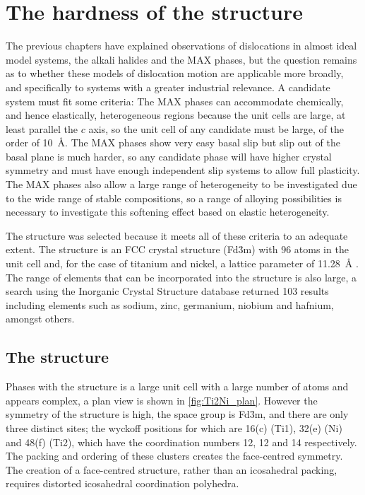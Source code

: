 

\chapter{\texorpdfstring{The hardness of the  structure}{The hardness of the Ti2Ni structure}}
\graphicspath{{hardness_of_ti_2_ni/Figs/}}
\label{chap:ti2ni_hardness}



The previous chapters have explained observations of dislocations in almost ideal model systems, the alkali halides and the MAX phases, but the question remains as to whether these models of dislocation motion are applicable more broadly, and specifically to systems with a greater industrial relevance. A candidate system must fit some criteria: The MAX phases can accommodate chemically, and hence elastically, heterogeneous regions because the unit cells are large, at least parallel the $c$ axis, so the unit cell of any candidate must be large, of the order of \SI{10}{\angstrom}. The MAX phases show very easy basal slip but slip out of the basal plane is much harder, so any candidate phase will have higher crystal symmetry and must have enough independent slip systems to allow full plasticity. The MAX phases also allow a large range of heterogeneity to be investigated due to the wide range of stable compositions, so a range of alloying possibilities is necessary to investigate this softening effect based on elastic heterogeneity.

The  structure was selected because it meets all of these criteria to an adequate extent. The structure is an FCC crystal structure (Fd\={3}m) with 96 atoms in the unit cell and, for the case of titanium and nickel, a lattice parameter of \SI{11.28}{\angstrom} \cite{Yurko1959,Yurko1962}. The range of elements that can be incorporated into the structure is also large, a search using the Inorganic Crystal Structure database \cite{ICSD} returned 103 results including elements such as sodium, zinc, germanium, niobium and hafnium, amongst others.

\section{The \texorpdfstring{}{Ti2Ni} structure}
\FloatBarrier


Phases with the  structure is a large unit cell with a large number of atoms and appears complex, a plan view is shown in \autoref{fig:Ti2Ni_plan}. However the symmetry of the structure is high, the space group is Fd\={3}m, and there are only three distinct sites; the wyckoff positions for which are 16(c) (Ti1), 32(e) (Ni) and 48(f) (Ti2), which have the coordination numbers 12, 12 and 14 respectively. The packing and ordering of these clusters creates the face-centred symmetry. The creation of a face-centred structure, rather than an icosahedral packing, requires distorted icosahedral coordination polyhedra.


